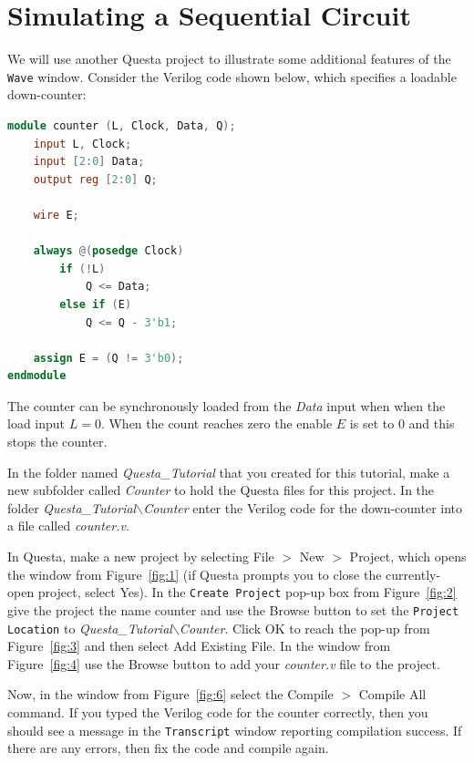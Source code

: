 \documentclass[11pt, twoside, pdftex]{article}
\begin{document}
\section{Simulating a Sequential Circuit}

We will use another Questa project to illustrate some additional features
of the \texttt{Wave} window.  Consider the Verilog code shown below, which 
specifies a loadable down-counter:
~\\
\begin{lstlisting}[language=Verilog]
module counter (L, Clock, Data, Q);
    input L, Clock;
    input [2:0] Data;
    output reg [2:0] Q;

    wire E; 

    always @(posedge Clock)
        if (!L)
            Q <= Data;
        else if (E)
            Q <= Q - 3'b1;

    assign E = (Q != 3'b0);
endmodule
\end{lstlisting}

The counter can be synchronously loaded from the {\it Data} input when when the load input
$L = 0$. When the count reaches zero the enable $E$ is set to 0 and this stops the counter. 

In the folder named {\it Questa\_Tutorial} that you created for this tutorial, make a new
subfolder called {\it Counter} to hold the Questa files for this project.
In the folder {\it Questa\_Tutorial$\backslash$Counter}
enter the Verilog code for the down-counter into a file called {\it counter.v}.

In Questa, make a new project by selecting {\sf File $>$ New $>$ Project}, which opens the window 
from Figure~\ref{fig:1} (if Questa prompts you to close the currently-open project, select {\sf Yes}). 
In the \texttt{Create Project} pop-up box from Figure~\ref{fig:2} give the project the name 
{\sf counter} and use the {\sf Browse} button to set the \texttt{Project Location} to
{\it Questa\_Tutorial$\backslash$Counter}. Click {\sf OK} to reach the pop-up from 
Figure~\ref{fig:3} and then select {\sf Add Existing File}. In the window from 
Figure~\ref{fig:4} use the {\sf Browse} button to add your {\it counter.v} file to the project. 

Now, in the window from Figure~\ref{fig:6} select the {\sf Compile $>$ Compile All} command.
If you typed the Verilog code for the counter correctly, then you should see a message in the
\texttt{Transcript} window reporting compilation success. If there are any errors, then fix the code
and compile again.
\end{document}
